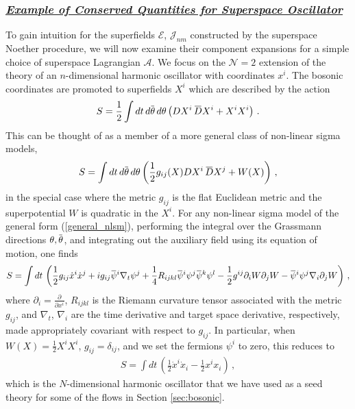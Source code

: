 \documentclass[12pt]{article}
\numberwithin{equation}{section}
\newcommand{\ul}{\underline}
\newcommand{\overbar}[1]{\mkern 1.5mu\overline{\mkern-1.5mu#1\mkern-1.5mu}\mkern 1.5mu}
\newcommand{\Dbar}{\overbar{D}}
\newcommand{\psib}{\overbar{\psi}}
\newcommand{\thetab}{\overbar{\theta}}
\begin{document}
\subsubsection*{\ul{\it Example of Conserved Quantities for Superspace Oscillator}}

To gain intuition for the superfields $\mathcal{E}$, $\mathcal{J}_{nm}$ constructed by the superspace Noether procedure, we will now examine their component expansions for a simple choice of superspace Lagrangian $\mathcal{A}$. We focus on the $\mathcal{N} = 2$ extension of the theory of an $n$-dimensional harmonic oscillator with coordinates $x^i$. The bosonic coordinates are promoted to superfields $X^i$ which are described by the action
%
\begin{align}
    S = \frac{1}{2} \int dt \, d \thetab \, d \theta \left( D X^i \, \Dbar X^i + X^i X^i \right) \, .
\end{align}
%
This can be thought of as a member of a more general class of non-linear sigma models,
%
\begin{align}\label{general_nlsm}
    S = \int dt \, d \thetab \, d \theta \left( \frac{1}{2} g_{ij} ( X ) D X^i \, \Dbar X^j + W ( X ) \right) \, ,
\end{align}
%
in the special case where the metric $g_{ij}$ is the flat Euclidean metric and the superpotential $W$ is quadratic in the $X^i$. For any non-linear sigma model of the general form (\ref{general_nlsm}), performing the integral over the Grassmann directions $\theta, \thetab$, and integrating out the auxiliary field using its equation of motion, one finds
%
\begin{align}
    S = \int dt \, \left( \frac{1}{2} g_{ij} \dot{x}^i \dot{x}^j + i g_{ij} \psib^i \nabla_t \psi^j + \frac{1}{4} R_{ijkl} \psib^i \psi^j \psib^k \psi^l - \frac{1}{2} g^{ij} \partial_i W \partial_j W - \psib^i \psi^j \nabla_i \partial_j W \right) \, , 
\end{align}
%
where $\partial_i = \frac{\partial}{\partial x^i}$, $R_{ijkl}$ is the Riemann curvature tensor associated with the metric $g_{ij}$, and $\nabla_t$, $\nabla_i$ are the time derivative and target space derivative, respectively, made appropriately covariant with respect to $g_{ij}$. In particular, when $W ( X ) = \frac{1}{2} X^i X^i$, $g_{ij} = \delta_{ij}$, and we set the fermions $\psi^i$ to zero, this reduces to
%
\begin{align}\label{bosonic_oscillator}
    S = \int dt \, \left( \frac{1}{2} \dot{x}^i \dot{x}_i - \frac{1}{2} x^i x_i \right) \, , 
\end{align}
%
which is the $N$-dimensional harmonic oscillator that we have used as a seed theory for some of the flows in Section \ref{sec:bosonic}.
\end{document}
